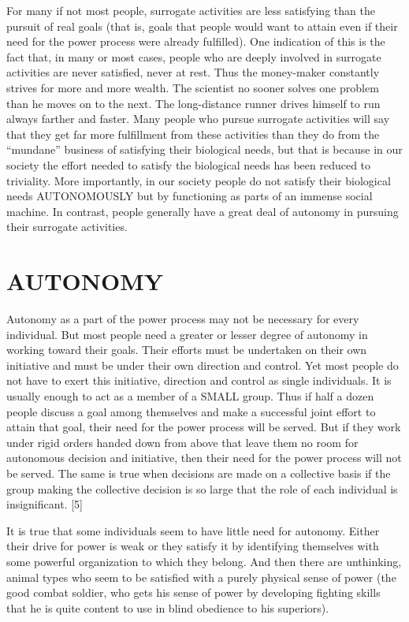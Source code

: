  For many if not most people, surrogate activities are less satisfying than the pursuit of real goals (that is, goals that people would want to attain even if their need for the power process were already fulfilled). One indication of this is the fact that, in many or most cases, people who are deeply involved in surrogate activities are never satisfied, never at rest. Thus the money-maker constantly strives for more and more wealth. The scientist no sooner solves one problem than he moves on to the next. The long-distance runner drives himself to run always farther and faster. Many people who pursue surrogate activities will say that they get far more fulfillment from these activities than they do from the “mundane” business of satisfying their biological needs, but that is because in our society the effort needed to satisfy the biological needs has been reduced to triviality. More importantly, in our society people do not satisfy their biological needs AUTONOMOUSLY but by functioning as parts of an immense social machine. In contrast, people generally have a great deal of autonomy in pursuing their surrogate activities.

\chapter{AUTONOMY}

 Autonomy as a part of the power process may not be necessary for every individual. But most people need a greater or lesser degree of autonomy in working toward their goals. Their efforts must be undertaken on their own initiative and must be under their own direction and control. Yet most people do not have to exert this initiative, direction and control as single individuals. It is usually enough to act as a member of a SMALL group. Thus if half a dozen people discuss a goal among themselves and make a successful joint effort to attain that goal, their need for the power process will be served. But if they work under rigid orders handed down from above that leave them no room for autonomous decision and initiative, then their need for the power process will not be served. The same is true when decisions are made on a collective basis if the group making the collective decision is so large that the role of each individual is insignificant. [5]

 It is true that some individuals seem to have little need for autonomy. Either their drive for power is weak or they satisfy it by identifying themselves with some powerful organization to which they belong. And then there are unthinking, animal types who seem to be satisfied with a purely physical sense of power (the good combat soldier, who gets his sense of power by developing fighting skills that he is quite content to use in blind obedience to his superiors).

